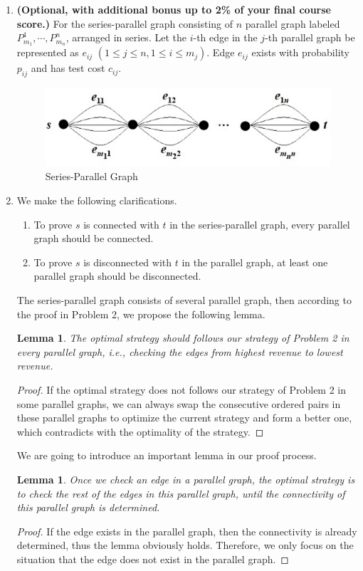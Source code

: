 \documentclass{oxmathproblems}
\makeatletter
\newtheorem{lemma}[theorem]{Lemma}
\theoremstyle{definition}
\renewenvironment{solution}[1][Solution] {\par\pushQED{\qed}\normalfont\topsep6\p@\@plus6\p@\relax\trivlist\item[\hskip\labelsep\bfseries#1\@addpunct{.}]\ignorespaces}{\popQED\endtrivlist\@endpefalse} \makeatother
\makeatother
\begin{document}
\begin{enumerate}
\item  \textbf{(Optional, with additional bonus up to 2\% of your final course score.)} For the series-parallel graph consisting of $n$ parallel graph labeled $P^1_{m_1}, \cdots, P^n_{m_n}$, arranged in series. Let the $i$-th edge in the $j$-th parallel graph be represented as $e_{ij}$ $(1\leq j \leq n, 1\leq i\leq m_j)$. Edge $e_{ij}$ exists with probability $p_{ij}$ and has test cost $c_{ij}$. 
\begin{figure}[htbp]
\centering
\includegraphics[width=11cm]{3.png}
\caption{Series-Parallel Graph}
\label{fig5}
\end{figure}
\begin{solution}We make the following clarifications.
	\vspace{-0.2cm}
	\begin{enumerate}
		\item To prove $s$ is connected with $t$ in the series-parallel graph, every parallel graph should be connected.
		\item To prove $s$ is disconnected with $t$ in the parallel graph, at least one parallel graph should be disconnected.
	\end{enumerate}

	The series-parallel graph consists of several parallel graph, then according to the proof in Problem 2, we propose the following lemma.
	
	\begin{lemma}\label{lemma8}
		The optimal strategy should follows our strategy of Problem 2 in every parallel graph, \textit{i.e.}, checking the edges from highest revenue to lowest revenue.
	\end{lemma}
	\begin{proof}
		If the optimal strategy does not follows our strategy of Problem 2 in some parallel graphs, we can always swap the consecutive ordered pairs in these parallel graphs to optimize the current strategy and form a better one, which contradicts with the optimality of the strategy.
	\end{proof}
	We are going to introduce an important lemma in our proof process.
	\begin{lemma}\label{lemma9}
		Once we check an edge in a parallel graph, the optimal strategy is to check the rest of the edges in this parallel graph, until the connectivity of this parallel graph is determined.
	\end{lemma}
	\begin{proof}
		If the edge exists in the parallel graph, then the connectivity is already determined, thus the lemma obviously holds. Therefore, we only focus on the situation that the edge does not exist in the parallel graph. 
		

\end{proof}
\end{solution}
\end{enumerate}
\end{document}
